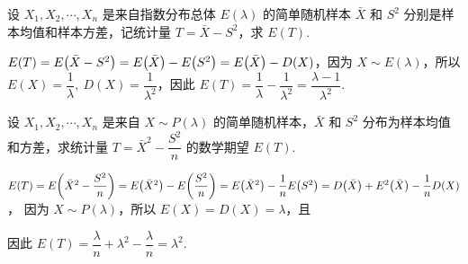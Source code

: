 \begin{example}
    设 $X_1,X_2,\cdots,X_n$ 是来自指数分布总体 $E(\lambda)$ 的简单随机样本 $\bar{X}$ 和 $S^2$ 分别是样本均值和样本方差，记统计量 $T=\bar{X}-S^2$，求 $E(T).$
\end{example}
\begin{solution}
    $E(T)=E\qty(\bar{X}-S^2)=E\qty(\bar{X})-E\qty(S^2)=E\qty(\bar{X})-D(X)$，因为 $X\sim E(\lambda)$，所以 $E(X)=\dfrac{1}{\lambda},~D(X)=\dfrac{1}{\lambda^2}$，因此 $E(T)=\dfrac{1}{\lambda}-\dfrac{1}{\lambda^2}=\dfrac{\lambda-1}{\lambda^2}.$
\end{solution}

\begin{example}
    设 $X_1,X_2,\cdots,X_n$ 是来自 $X\sim P(\lambda)$ 的简单随机样本，$\bar{X}$ 和 $S^2$ 分布为样本均值和方差，求统计量 $T=\bar{X}^2-\dfrac{S^2}{n}$ 的数学期望 $E(T).$
\end{example}
\begin{solution}
    $E(T)=E\qty(\bar{X}^2-\dfrac{S^2}{n})=E\qty(\bar{X}^2)-E\qty(\dfrac{S^2}{n})=E\qty(\bar{X}^2)-\dfrac{1}{n}E\qty(S^2)=D\qty(\bar{X})+E^2\qty(\bar{X})-\dfrac{1}{n}D(X)$，
    因为 $X\sim P(\lambda)$，所以 $E(X)=D(X)=\lambda$，且 
    因此 $E(T)=\dfrac{\lambda}{n}+\lambda^2-\dfrac{\lambda}{n}=\lambda^2.$
\end{solution}
